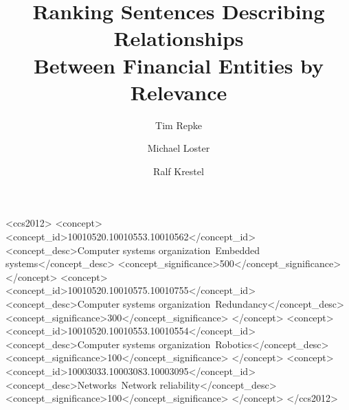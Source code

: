 \documentclass[
	format=sigconf,
	review=false]{acmart}
\title{Ranking Sentences Describing Relationships\\ Between Financial Entities by Relevance}
\author{Tim Repke}
\affiliation{%
	\institution{Hasso Plattner Institute}
	\city{Potsdam}
	\country{Germany}
}
\author{Michael Loster}
\affiliation{%
	\institution{Hasso Plattner Institute}
	\city{Potsdam}
	\country{Germany}
}
\author{Ralf Krestel}
\affiliation{%
	\institution{Hasso Plattner Institute}
	\city{Potsdam}
	\country{Germany}
}
\begin{document}
%

%
%
\begin{CCSXML}
<ccs2012>
 <concept>
  <concept_id>10010520.10010553.10010562</concept_id>
  <concept_desc>Computer systems organization~Embedded systems</concept_desc>
  <concept_significance>500</concept_significance>
 </concept>
 <concept>
  <concept_id>10010520.10010575.10010755</concept_id>
  <concept_desc>Computer systems organization~Redundancy</concept_desc>
  <concept_significance>300</concept_significance>
 </concept>
 <concept>
  <concept_id>10010520.10010553.10010554</concept_id>
  <concept_desc>Computer systems organization~Robotics</concept_desc>
  <concept_significance>100</concept_significance>
 </concept>
 <concept>
  <concept_id>10003033.10003083.10003095</concept_id>
  <concept_desc>Networks~Network reliability</concept_desc>
  <concept_significance>100</concept_significance>
 </concept>
</ccs2012>  
\end{CCSXML}





\maketitle




 
\end{document}
